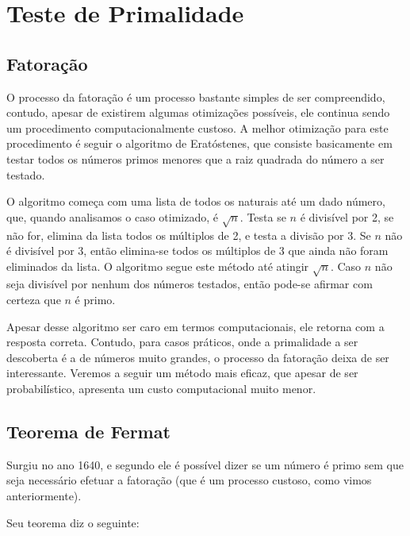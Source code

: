 \section*{Teste de Primalidade}

\vspace{1.5em}
\subsection*{Fatoração}

O processo da fatoração é um processo bastante simples de ser compreendido,
contudo, apesar de existirem algumas otimizações possíveis, ele continua sendo
um procedimento computacionalmente custoso. A melhor otimização para este
procedimento é seguir o algoritmo de Eratóstenes, que consiste basicamente em
testar todos os números primos menores que a raiz quadrada do número a ser
testado.

O algoritmo começa com uma lista de todos os naturais até um dado número, que,
quando analisamos o caso otimizado, é $\sqrt{n}$. Testa se $n$ é divisível por 2, se não for,
elimina da lista todos os múltiplos de 2, e testa a divisão por 3. Se $n$ não é
divisível por 3, então elimina-se todos os múltiplos de 3 que ainda não foram
eliminados da lista. O algoritmo segue este método até atingir $\sqrt{n}$.
Caso $n$ não seja divisível por nenhum dos números testados, então pode-se
afirmar com certeza que $n$ é primo.

Apesar desse algoritmo ser caro em termos computacionais, ele retorna com a
resposta correta. Contudo, para casos práticos, onde a primalidade a ser
descoberta é a de números muito grandes, o processo da fatoração deixa de ser
interessante. Veremos a seguir um método mais eficaz, que apesar de ser
probabilístico, apresenta um custo computacional muito menor.


\vspace{1.5em}
\subsection*{Teorema de Fermat}

Surgiu no ano 1640, e segundo ele é possível dizer se um número é primo sem
que seja necessário efetuar a fatoração (que é um processo custoso, como
vimos anteriormente).

Seu teorema diz o seguinte:

